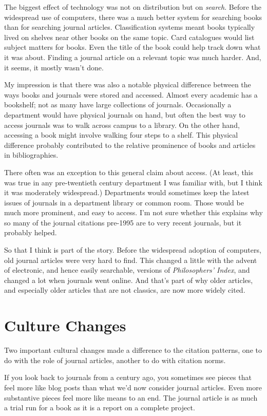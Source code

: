 \documentclass[
  12pt,
  letterpaper,
  DIV=11,
  numbers=noendperiod]{scrartcl}
\begin{document}
The biggest effect of technology was not on distribution but on
\emph{search}. Before the widespread use of computers, there was a much
better system for searching books than for searching journal articles.
Classification systems meant books typically lived on shelves near other
books on the same topic. Card catalogues would list subject matters for
books. Even the title of the book could help track down what it was
about. Finding a journal article on a relevant topic was much harder.
And, it seems, it mostly wasn't done.

My impression is that there was also a notable physical difference
between the ways books and journals were stored and accessed. Almost
every academic has a bookshelf; not as many have large collections of
journals. Occasionally a department would have physical journals on
hand, but often the best way to access journals was to walk across
campus to a library. On the other hand, accessing a book might involve
walking four steps to a shelf. This physical difference probably
contributed to the relative prominence of books and articles in
bibliographies.

There often was an exception to this general claim about access. (At
least, this was true in any pre-twentieth century department I was
familiar with, but I think it was moderately widespread.) Departments
would sometimes keep the latest issues of journals in a department
library or common room. Those would be much more prominent, and easy to
access. I'm not sure whether this explains why so many of the journal
citations pre-1995 are to very recent journals, but it probably helped.

So that I think is part of the story. Before the widespread adoption of
computers, old journal articles were very hard to find. This changed a
little with the advent of electronic, and hence easily searchable,
versions of \emph{Philosophers' Index}, and changed a lot when journals
went online. And that's part of why older articles, and especially older
articles that are not classics, are now more widely cited.

\section{Culture Changes}\label{sec-culture}

Two important cultural changes made a difference to the citation
patterns, one to do with the role of journal articles, another to do
with citation norms.

If you look back to journals from a century ago, you sometimes see
pieces that feel more like blog posts than what we'd now consider
journal articles. Even more substantive pieces feel more like means to
an end. The journal article is as much a trial run for a book as it is a
report on a complete project.
\end{document}
